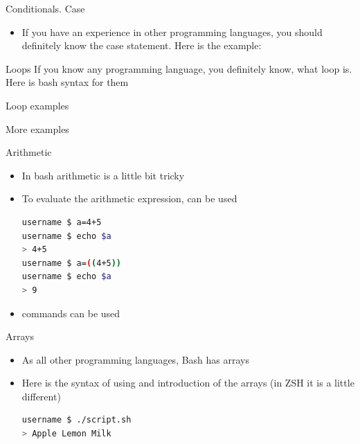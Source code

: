 \documentclass[usenames,dvipsnames,10pt,aspectratio=169]{beamer}
\begin{document}
\begin{frame}{Conditionals. Case}
    \begin{itemize}
        \item If you have an experience in other programming languages, you should definitely know the case statement. Here is the example:
        
    \end{itemize}
\end{frame}

\begin{frame}{Loops}
    If you know any programming language, you definitely know, what loop is. Here is bash syntax for them
    
    
    
\end{frame}

\begin{frame}{Loop examples}
    
    
\end{frame}

\begin{frame}{More  examples}
    
\end{frame}

\begin{frame}[fragile]{Arithmetic}
    \begin{itemize}
        \item In bash arithmetic is a little bit tricky
        \item To evaluate the arithmetic expression,  can be used
        \begin{lstlisting}[language=Bash, style=shellstyle]
username $ a=4+5
username $ echo $a
> 4+5
username $ a=((4+5))
username $ echo $a
> 9 \end{lstlisting}
        \item {} commands can be used 
    \end{itemize}
\end{frame}

\begin{frame}[fragile]{Arrays}
    \begin{itemize}
        \item As all other programming languages, Bash has arrays
        \item Here is the syntax of using and introduction of the arrays (in ZSH it is a little different)
        
        \begin{lstlisting}[language=Bash, style=shellstyle]
username $ ./script.sh
> Apple Lemon Milk
        \end{lstlisting}
    \end{itemize}
\end{frame}
\end{document}
